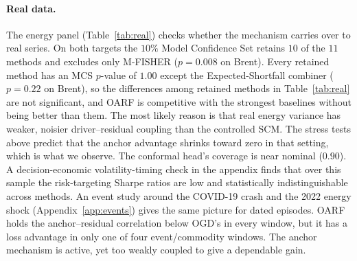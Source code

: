 \documentclass[11pt]{article}
\theoremstyle{plain}
\theoremstyle{remark}
\newcommand{\OARF}{\textsc{OARF}}
\begin{document}
\paragraph{Real data.}
The energy panel (Table~\ref{tab:real}) checks whether the mechanism carries over to real series. On both targets the $10\%$ Model Confidence Set retains $10$ of the $11$ methods and excludes only M-FISHER ($p=0.008$ on Brent). Every retained method has an MCS $p$-value of $1.00$ except the Expected-Shortfall combiner ($p=0.22$ on Brent), so the differences among retained methods in Table~\ref{tab:real} are not significant, and \OARF{} is competitive with the strongest baselines without being better than them. The most likely reason is that real energy
variance has weaker, noisier driver--residual coupling than the controlled SCM. The
stress tests above predict that the anchor advantage shrinks toward zero in that
setting, which is what we observe. The conformal head's
coverage is near nominal ($0.90$). A decision-economic volatility-timing check in the appendix finds that over this sample the risk-targeting Sharpe ratios are low and
statistically indistinguishable across methods.
An event study around the COVID-19 crash and the 2022 energy shock
(Appendix~\ref{app:events}) gives the same picture for dated episodes. \OARF{} holds
the anchor--residual correlation below OGD's in every window, but it has a loss
advantage in only one of four event/commodity windows. The anchor mechanism is active,
yet too weakly coupled to give a dependable gain.
\end{document}

